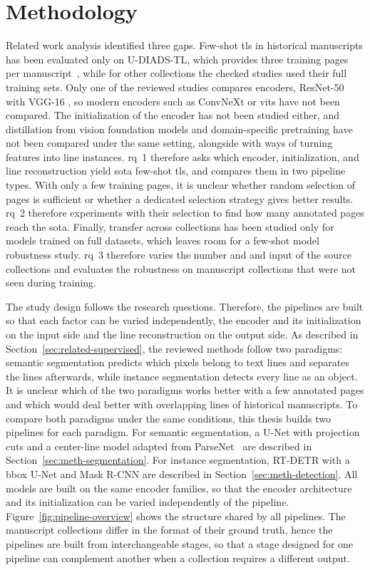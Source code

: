 \chapter{Methodology}
\label{sec:meth}

Related work analysis identified three gaps. Few-shot \gls{tls} in historical manuscripts has been evaluated only on U-DIADS-TL, which provides three training pages per manuscript~\cite{Zottin_2025_FEST}, while for other collections the checked studies used their full training sets. Only one of the reviewed studies compares encoders, ResNet-50 with VGG-16 \cite{jindal2023fasterrcnn}, so modern encoders such as ConvNeXt or \glspl{vit} have not been compared. The initialization of the encoder has not been studied either, and distillation from vision foundation models and domain-specific pretraining have not been compared under the same setting, alongside with ways of turning features into line instances. \gls{rq}~1 therefore asks which encoder, initialization, and line reconstruction yield \gls{sota} few-shot \gls{tls}, and compares them in two pipeline types. With only a few training pages, it is unclear whether random selection of pages is sufficient or whether a dedicated selection strategy gives better results. \gls{rq}~2 therefore experiments with their selection to find how many annotated pages reach the \gls{sota}. Finally, transfer across collections has been studied only for models trained on full datasets, which leaves room for a few-shot model robustness study. \gls{rq}~3 therefore varies the number and and input of the source collections and evaluates the robustness on manuscript collections that were not seen during training.

\label{sec:meth-overview}
The study design follows the research questions. Therefore, the pipelines are built so that each factor can be varied independently, the encoder and its initialization on the input side and the line reconstruction on the output side. As described in Section~\ref{sec:related-supervised}, the reviewed methods follow two paradigms: semantic segmentation predicts which pixels belong to text lines and separates the lines afterwards, while instance segmentation detects every line as an object. It is unclear which of the two paradigms works better with a few annotated pages and which would deal better with overlapping lines of historical manuscripts. To compare both paradigms under the same conditions, this thesis builds two pipelines for each paradigm. For semantic segmentation, a U-Net with projection cuts and a center-line model adapted from ParseNet~\cite{kodym2021page} are described in Section~\ref{sec:meth-segmentation}. For instance segmentation, RT-DETR with a \gls{bbox} U-Net and Mask R-CNN are described in Section~\ref{sec:meth-detection}. All models are built on the same encoder families, so that the encoder architecture and its initialization can be varied independently of the pipeline. Figure~\ref{fig:pipeline-overview} shows the structure shared by all pipelines. The manuscript collections differ in the format of their ground truth, hence the pipelines are built from interchangeable stages, so that a stage designed for one pipeline can complement another when a collection requires a different output. 

